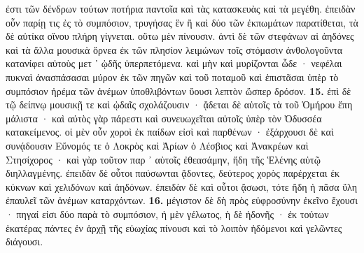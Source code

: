 \documentclass[a4paper, 11pt, oneside, polutonikogreek, german]{article}
\begin{document}
ἐστι τῶν δένδρων τούτων ποτήρια παντοῖα καὶ τὰς κατασκευὰς καὶ τὰ μεγέθη. ἐπειδὰν οὖν παρίῃ τις ἐς τὸ συμπόσιον, τρυγήσας ἓν ἢ καὶ δύο τῶν ἐκπωμάτων παρατίθεται, τὰ δὲ αὐτίκα οἴνου πλήρη γίγνεται. οὕτω μὲν πίνουσιν. ἀντὶ δὲ τῶν στεφάνων αἱ ἀηδόνες καὶ τὰ ἄλλα μουσικὰ ὄρνεα ἐκ τῶν πλησίον λειμώνων τοῖς στόμασιν ἀνθολογοῦντα κατανίφει αὐτοὺς μετ ᾽ ᾠδῆς ὑπερπετόμενα. καὶ μὴν καὶ μυρίζονται ὧδε · νεφέλαι πυκναὶ ἀνασπάσασαι μύρον ἐκ τῶν πηγῶν καὶ τοῦ ποταμοῦ καὶ ἐπιστᾶσαι ὑπὲρ τὸ συμπόσιον ἠρέμα τῶν ἀνέμων ὑποθλιβόντων ὕουσι λεπτὸν ὥσπερ δρόσον. \textbf{15.} ἐπὶ δὲ τῷ δείπνῳ μουσικῇ τε καὶ ᾠδαῖς σχολάζουσιν · ᾄδεται δὲ αὐτοῖς τὰ τοῦ Ὁμήρου ἔπη μάλιστα · καὶ αὐτὸς γὰρ πάρεστι καὶ συνευωχεῖται αὐτοῖς ὑπὲρ τὸν Ὀδυσσέα κατακείμενος. οἱ μὲν οὖν χοροὶ ἐκ παίδων εἰσὶ καὶ παρθένων · ἐξάρχουσι δὲ καὶ συνᾴδουσιν Εὔνομός τε ὁ Λοκρὸς καὶ Ἀρίων ὁ Λέσβιος καὶ Ἀνακρέων καὶ Στησίχορος · καὶ γὰρ τοῦτον παρ ᾽ αὐτοῖς ἐθεασάμην, ἤδη τῆς Ἑλένης αὐτῷ διηλλαγμένης. ἐπειδὰν δὲ οὗτοι παύσωνται ᾄδοντες, δεύτερος χορὸς παρέρχεται ἐκ κύκνων καὶ χελιδόνων καὶ ἀηδόνων. ἐπειδὰν δὲ καὶ οὗτοι ᾄσωσι, τότε ἤδη ἡ πᾶσα ὕλη ἐπαυλεῖ τῶν ἀνέμων καταρχόντων. \textbf{16.} μέγιστον δὲ δὴ πρὸς εὐφροσύνην ἐκεῖνο ἔχουσι · πηγαί εἰσι δύο παρὰ τὸ συμπόσιον, ἡ μὲν γέλωτος, ἡ δὲ ἡδονῆς · ἐκ τούτων ἑκατέρας πάντες ἐν ἀρχῇ τῆς εὐωχίας πίνουσι καὶ τὸ λοιπὸν ἡδόμενοι καὶ γελῶντες διάγουσι.
\end{document}
